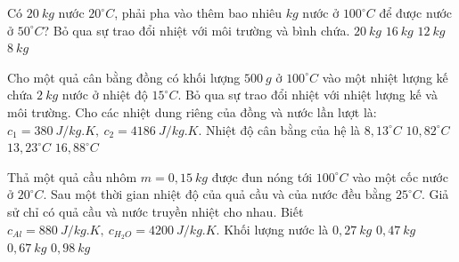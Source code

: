 \begin{ex} 
	Có $20 \ kg$ nước $20^\circ C$, phải pha vào thêm bao nhiêu $kg$ nước ở $100^\circ C$ để được nước ở $50^\circ C$? Bỏ qua sự trao đổi nhiệt với môi trường và bình chứa.
	\choice
	{$20 \ kg$}
	{$16 \ kg$}
	{\True  $12 \ kg$}
	{$8 \ kg$}
\end{ex}

\begin{ex}
	Cho một quả cân bằng đồng có khối lượng $500 \ g$ ở $100^\circ C$ vào một nhiệt lượng kế chứa $2 \ kg$ nước ở nhiệt độ $15^\circ C$. Bỏ qua sự trao đổi nhiệt với nhiệt lượng kế và môi trường. Cho các nhiệt dung riêng của đồng và nước lần lượt là: $c_1=380 \ J / kg . K,\ c_2=4186 \ J / kg . K$. Nhiệt độ cân bằng của hệ là
	\choice
	{$8,13^\circ C$}
	{$10,82^\circ C$}
	{$13,23^\circ C$}
	{\True $16,88^\circ C$}
	\end{ex}
	\begin{ex}%
		Thả một quả cầu nhôm $m=0,15\ kg$ được đun nóng tới $100^{\circ}C$ vào một cốc nước ở $20^{\circ}C$. Sau một thời gian nhiệt độ của quả cầu và của nước đều bằng $25^{\circ}C$. Giả sử chỉ có quả cầu và nước truyền nhiệt cho nhau. Biết  $c_{Al}=880\ J/kg.K,\ c_{H_2O}=4200\ J/kg.K$. Khối lượng nước là 
		\choice
		{$0,27\ kg$}
		{\True $0,47\ kg$}
		{$0,67\ kg$}
		{$0,98\ kg$}
		\end{ex}
	
